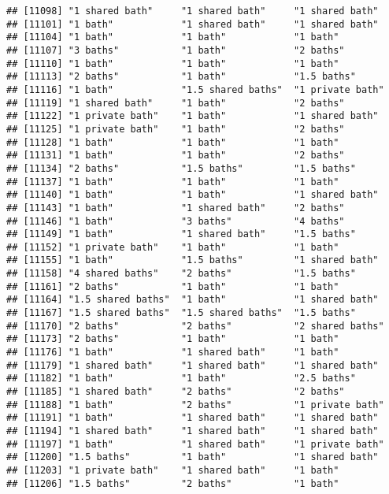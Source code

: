 \documentclass[
]{article}
\begin{document}
\begin{verbatim}
## [11098] "1 shared bath"     "1 shared bath"     "1 shared bath"    
## [11101] "1 bath"            "1 shared bath"     "1 shared bath"    
## [11104] "1 bath"            "1 bath"            "1 bath"           
## [11107] "3 baths"           "1 bath"            "2 baths"          
## [11110] "1 bath"            "1 bath"            "1 bath"           
## [11113] "2 baths"           "1 bath"            "1.5 baths"        
## [11116] "1 bath"            "1.5 shared baths"  "1 private bath"   
## [11119] "1 shared bath"     "1 bath"            "2 baths"          
## [11122] "1 private bath"    "1 bath"            "1 shared bath"    
## [11125] "1 private bath"    "1 bath"            "2 baths"          
## [11128] "1 bath"            "1 bath"            "1 bath"           
## [11131] "1 bath"            "1 bath"            "2 baths"          
## [11134] "2 baths"           "1.5 baths"         "1.5 baths"        
## [11137] "1 bath"            "1 bath"            "1 bath"           
## [11140] "1 bath"            "1 bath"            "1 shared bath"    
## [11143] "1 bath"            "1 shared bath"     "2 baths"          
## [11146] "1 bath"            "3 baths"           "4 baths"          
## [11149] "1 bath"            "1 shared bath"     "1.5 baths"        
## [11152] "1 private bath"    "1 bath"            "1 bath"           
## [11155] "1 bath"            "1.5 baths"         "1 shared bath"    
## [11158] "4 shared baths"    "2 baths"           "1.5 baths"        
## [11161] "2 baths"           "1 bath"            "1 bath"           
## [11164] "1.5 shared baths"  "1 bath"            "1 shared bath"    
## [11167] "1.5 shared baths"  "1.5 shared baths"  "1.5 baths"        
## [11170] "2 baths"           "2 baths"           "2 shared baths"   
## [11173] "2 baths"           "1 bath"            "1 bath"           
## [11176] "1 bath"            "1 shared bath"     "1 bath"           
## [11179] "1 shared bath"     "1 shared bath"     "1 shared bath"    
## [11182] "1 bath"            "1 bath"            "2.5 baths"        
## [11185] "1 shared bath"     "2 baths"           "2 baths"          
## [11188] "1 bath"            "2 baths"           "1 private bath"   
## [11191] "1 bath"            "1 shared bath"     "1 shared bath"    
## [11194] "1 shared bath"     "1 shared bath"     "1 shared bath"    
## [11197] "1 bath"            "1 shared bath"     "1 private bath"   
## [11200] "1.5 baths"         "1 bath"            "1 shared bath"    
## [11203] "1 private bath"    "1 shared bath"     "1 bath"           
## [11206] "1.5 baths"         "2 baths"           "1 bath"           

\end{verbatim}
\end{document}
